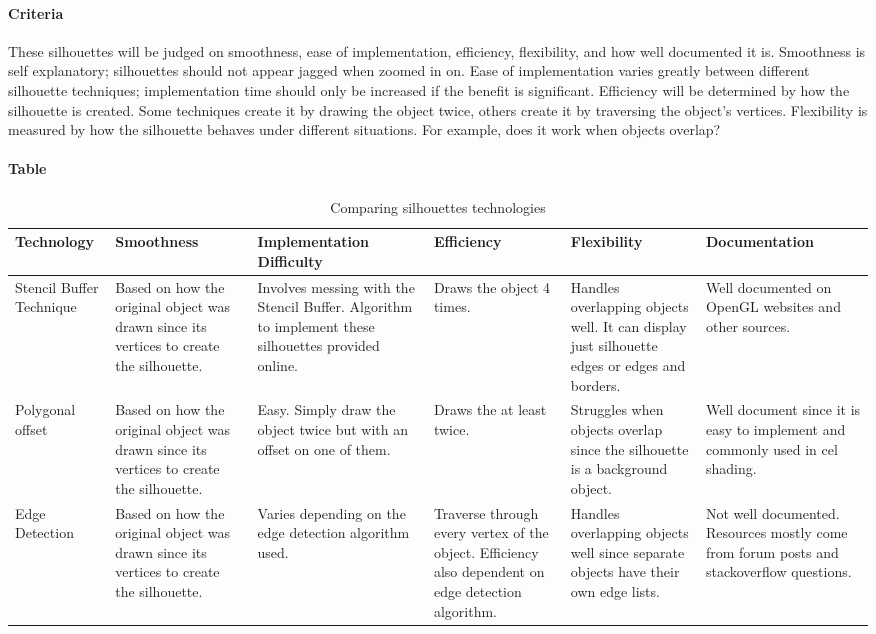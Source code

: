 \paragraph{Criteria}
These silhouettes will be judged on smoothness, ease of implementation, efficiency, flexibility, and how well documented it is.
Smoothness is self explanatory; silhouettes should not appear jagged when zoomed in on.
Ease of implementation varies greatly between different silhouette techniques; implementation time should only be increased if the benefit is significant.
Efficiency will be determined by how the silhouette is created. Some techniques create it by drawing the object twice, others create it by traversing the object's vertices.
Flexibility is measured by how the silhouette behaves under different situations. For example, does it work when objects overlap?

\paragraph{Table}
\begin{center}
\begin{table}[H]
\begin{tabular}{ | m{7em} | m{7em} | m{7em} | m{7em} | m{7em} | m{7em} |  } 
\hline
\textbf{Technology}  & \textbf{Smoothness} & \textbf{Implementation Difficulty} & \textbf{Efficiency} & \textbf{Flexibility} & \textbf{Documentation} \\ \hline
Stencil Buffer Technique & Based on how the original object was drawn since its vertices to create the silhouette. & Involves messing with the Stencil Buffer. Algorithm to implement these silhouettes provided online. & Draws the object 4 times. & Handles overlapping objects well. It can display just silhouette edges or edges and borders. & Well documented on OpenGL websites and other sources.  \\ \hline
Polygonal offset & Based on how the original object was drawn since its vertices to create the silhouette. & Easy. Simply draw the object twice but with an offset on one of them. & Draws the at least twice. & Struggles when objects overlap since the silhouette is a background object. & Well document since it is easy to implement and commonly used in cel shading.  \\ \hline
Edge Detection & Based on how the original object was drawn since its vertices to create the silhouette. & Varies depending on the edge detection algorithm used. & Traverse through every vertex of the object. Efficiency also dependent on edge detection algorithm. & Handles overlapping objects well since separate objects have their own edge lists. & Not well documented. Resources mostly come from forum posts and stackoverflow questions. \\ \hline
\end{tabular}
\newline
\caption{Comparing silhouettes technologies}
\label{table:silhouettes}
\end{table}
\end{center}

